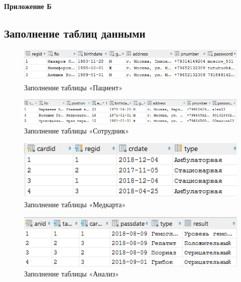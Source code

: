 \documentclass[14pt,a4paper,russian]{extreport}
\begin{document}
\newpage
\hfill\textbf{Приложение Б}
\setcounter{figure}{0}

\subsection*{Заполнение таблиц данными}
\setlength{\textfloatsep}{2pt}
\begin{figure}[h!]
        \center\includegraphics[scale=1]{patient}
        \caption{Заполнение таблицы «Пациент»}
        \label{fig:patient}
\end{figure}

\vspace{0.00mm}

\begin{figure}[h!]
        \center\includegraphics[scale=0.83]{employee}
        \caption{Заполнение таблицы «Сотрудник»}
        \label{fig:employee}
\end{figure}

\vspace{0.00mm}

\begin{figure}[h!]
        \center\includegraphics[scale=1]{medcard}
        \caption{Заполнение таблицы «Медкарта»}
        \label{fig:medcard}
\end{figure}

\vspace{0.00mm}

\begin{figure}[h!]
        \center\includegraphics[scale=1]{analysis}
        \caption{Заполнение таблицы «Анализ»}
        \label{fig:employee}
\end{figure}
\end{document}
